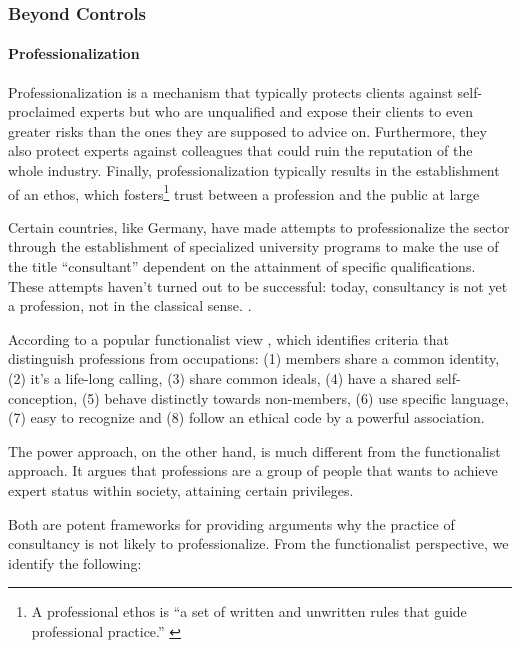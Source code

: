\documentclass[12pt]{article}
\begin{document}
\hypertarget{beyond-controls}{%
\subsubsection{Beyond Controls}\label{beyond-controls}}

\hypertarget{professionalization}{%
\paragraph{Professionalization}\label{professionalization}}

Professionalization is a mechanism that typically protects clients
against self-proclaimed experts but who are unqualified and expose their
clients to even greater risks than the ones they are supposed to advice
on. \citep[ 71]{kieser2006} Furthermore, they also protect experts
against colleagues that could ruin the reputation of the whole industry.
Finally, professionalization typically results in the establishment of
an ethos, which fosters\footnote{A professional ethos is ``a set of
  written and unwritten rules that guide professional practice.''
  \citep{enstad2017}} trust between a profession and the public at large
\citep{sokolowski1991}

Certain countries, like Germany, have made attempts to professionalize
the sector through the establishment of specialized university programs
to make the use of the title ``consultant'' dependent on the attainment
of specific qualifications. These attempts haven't turned out to be
successful: today, consultancy is not yet a profession, not in the
classical sense. \citep[ 73]{kieser2006}.

According to a popular functionalist view \citep{goode1957}, which
identifies criteria that distinguish professions from occupations: (1)
members share a common identity, (2) it's a life-long calling, (3) share
common ideals, (4) have a shared self-conception, (5) behave distinctly
towards non-members, (6) use specific language, (7) easy to recognize
and (8) follow an ethical code by a powerful association.

The power approach, on the other hand, is much different from the
functionalist approach. It argues that professions are a group of people
that wants to achieve expert status within society, attaining certain
privileges. \citep[ 75]{kieser2006}

Both are potent frameworks for providing arguments why the practice of
consultancy is not likely to professionalize. From the functionalist
perspective, we identify the following:
\end{document}
